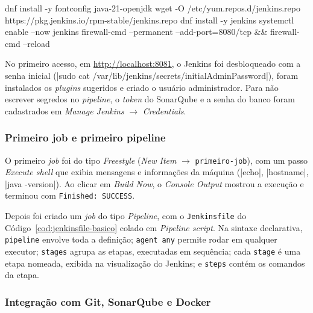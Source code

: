 \begin{terminal}[caption={Principais comandos da instalação do Jenkins (trecho do provision.sh)},label={cod:jenkins-instala}]
dnf install -y fontconfig java-21-openjdk
wget -O /etc/yum.repos.d/jenkins.repo https://pkg.jenkins.io/rpm-stable/jenkins.repo
dnf install -y jenkins
systemctl enable --now jenkins
firewall-cmd --permanent --add-port=8080/tcp && firewall-cmd --reload
\end{terminal}

No primeiro acesso, em \url{http://localhost:8081}, o Jenkins foi desbloqueado com a senha inicial
(\cod|sudo cat /var/lib/jenkins/secrets/initialAdminPassword|), foram instalados os
\textit{plugins} sugeridos e criado o usuário administrador. Para não escrever segredos no
\textit{pipeline}, o \textit{token} do SonarQube e a senha do banco foram cadastrados em
\textit{Manage Jenkins} $\rightarrow$ \textit{Credentials}.

\subsubsection{Primeiro job e primeiro pipeline}

O primeiro \textit{job} foi do tipo \textit{Freestyle} (\textit{New Item} $\rightarrow$
\texttt{primeiro-job}), com um passo \textit{Execute shell} que exibia mensagens e informações da
máquina (\cod|echo|, \cod|hostname|, \cod|java -version|). Ao clicar em \textit{Build Now}, o
\textit{Console Output} mostrou a execução e terminou com \texttt{Finished: SUCCESS}.

Depois foi criado um \textit{job} do tipo \textit{Pipeline}, com o \texttt{Jenkinsfile} do
Código~\ref{cod:jenkinsfile-basico} colado em \textit{Pipeline script}. Na sintaxe declarativa,
\texttt{pipeline} envolve toda a definição; \texttt{agent any} permite rodar em qualquer executor;
\texttt{stages} agrupa as etapas, executadas em sequência; cada \texttt{stage} é uma etapa nomeada,
exibida na visualização do Jenkins; e \texttt{steps} contém os comandos da etapa.


\subsubsection{Integração com Git, SonarQube e Docker}

